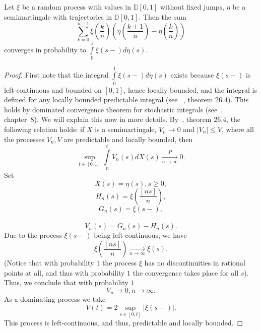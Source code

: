 \documentclass[12pt, a4paper, titlepage]{article}
\begin{document}
 \begin{lem}\label{integralDominatedConvergenceLem}
Let $\xi$ be a random process with values in $\mathbb{D}[0,1]$
without fixed jumps, 
$\eta$ be a semimartingale with trajectories in $\mathbb{D}[0,1]$. 
Then the sum
$$\sum\limits_{k=0}^{n-1}\xi\left(\frac{k}{n}\right)\left(\eta\left(\frac{k+1}{n}\right)-
\eta\left(\frac{k}{n}\right)\right)$$
converges in probability to $\int\limits_0^1 \xi(s-)d\eta(s).$
\end{lem}
\begin{proof}
 First note that the integral $\int\limits_0^1 \xi(s-)d\eta(s)$ exists
because $\xi(s-)$ is left-continuous and bounded on $[0,1]$, hence locally bounded, 
and the integral is defined for any locally bounded predictable integral 
(see ~\cite{Kallenberg}, theorem 26.4). 
 This holds by dominated convergence
 theorem for stochastic integrals (see~\cite{Meyer}, chapter~8).
We will explain this now in more details. By~\cite{Kallenberg}, theorem 26.4, 
the following relation holds: 
if $X$ is a semimartingale,
$V_n\to 0$ and $|V_n|\le V$, where all the processes $V_n, V$ are predictable and locally bounded,
then 
$$\sup\limits_{t \in [0,1]}\int\limits_0^t V_n(s)dX(s)\xrightarrow[n\to\infty]{P}0.$$
Set
$$X(s)=\eta(s),s \ge 0,$$
$$H_n(s)=\xi\left(\frac{[ns]}{n}\right),$$
$$G_n(s)=\xi(s-),$$\
$$V_n(s)=G_n(s)-H_n(s).$$
Due to the process $\xi(s-)$ being left-continuous, we have
$$\xi\left(\frac{[ns]}{n}\right)\xrightarrow[n\to\infty]{}\xi(s).$$
(Notice that with probability $1$ the process $\xi$ has no discontinuities
in rational points at all, 
and thus with probability $1$
the convergence takes place for all $s$).
Thus, we conclude that with probability $1$
$$V_n\to 0, n \to \infty.$$
As a dominating process we take
$$V(t)=2\sup\limits_{s\in [0,t]}|\xi(s-)|.$$
This process is left-continuous, and thus, predictable and locally bounded.  
\end{proof}
\end{document}
